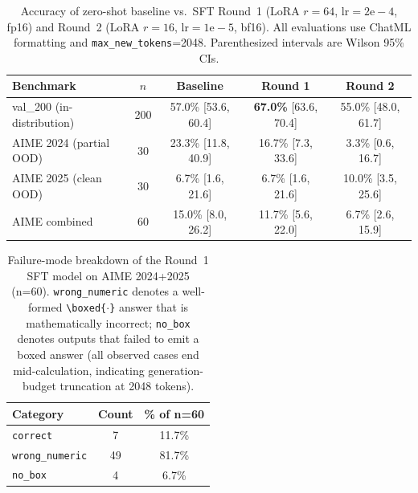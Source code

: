 

\begin{table}[t]
\centering
\caption{Accuracy of zero-shot baseline vs.\ SFT Round~1 (LoRA $r{=}64$, $\text{lr}{=}2\mathrm{e}{-}4$, fp16) and Round~2 (LoRA $r{=}16$, $\text{lr}{=}1\mathrm{e}{-}5$, bf16). All evaluations use ChatML formatting and \texttt{max\_new\_tokens}=2048. Parenthesized intervals are Wilson 95\% CIs.}
\label{tab:main-results}
\begin{tabular}{lcccc}
\toprule
\textbf{Benchmark} & $n$ & \textbf{Baseline} & \textbf{Round 1} & \textbf{Round 2} \\
\midrule
val\_200 (in-distribution) & 200 & 57.0\% [53.6, 60.4] & \textbf{67.0\%} [63.6, 70.4] & 55.0\% [48.0, 61.7] \\
AIME 2024 (partial OOD)    & 30  & 23.3\% [11.8, 40.9] & 16.7\% [7.3, 33.6]  & \phantom{0}3.3\% [0.6, 16.7]  \\
AIME 2025 (clean OOD)      & 30  & \phantom{0}6.7\% [1.6, 21.6] & \phantom{0}6.7\% [1.6, 21.6] & 10.0\% [3.5, 25.6]  \\
AIME combined              & 60  & 15.0\% [8.0, 26.2]  & 11.7\% [5.6, 22.0]  & \phantom{0}6.7\% [2.6, 15.9]  \\
\bottomrule
\end{tabular}
\end{table}


\begin{table}[t]
\centering
\caption{Failure-mode breakdown of the Round~1 SFT model on AIME 2024+2025 (n=60). \texttt{wrong\_numeric} denotes a well-formed \texttt{\textbackslash boxed\{$\cdot$\}} answer that is mathematically incorrect; \texttt{no\_box} denotes outputs that failed to emit a boxed answer (all observed cases end mid-calculation, indicating generation-budget truncation at 2048 tokens).}
\label{tab:error-analysis}
\begin{tabular}{lcc}
\toprule
\textbf{Category}   & \textbf{Count} & \textbf{\% of n=60} \\
\midrule
\texttt{correct}         & \phantom{0}7 & 11.7\% \\
\texttt{wrong\_numeric}  & 49 & 81.7\% \\
\texttt{no\_box}         & \phantom{0}4 & \phantom{0}6.7\% \\
\bottomrule
\end{tabular}
\end{table}


